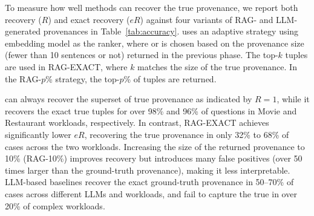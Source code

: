 \vspace{1pt}
To measure how well methods can recover the true provenance, we report both recovery ($R$) and exact recovery ($eR$)  against four variants of RAG- and LLM-generated provenances in Table~\ref{tab:accuracy}.  \sys uses an adaptive strategy using embedding model as the ranker, where  or  is chosen based on the provenance size (fewer than 10 sentences or not) returned in the previous phase. %
  The top-$k$ tuples are used in RAG-EXACT, where $k$ matches the size of the true provenance. In the RAG-$p$\% strategy, the top-$p$\% of tuples are returned.

\sys can always recover the superset of true provenance as indicated by $R=1$, while it recovers the exact true tuples for over 98\% and 96\% of questions in Movie and Restaurant workloads, respectively. %
In contrast, RAG-EXACT achieves significantly lower $eR$, recovering the  true provenance in only 32\% to 68\% of cases across the two workloads.  Increasing the size of the returned provenance to 10\% (RAG-10\%) improves recovery but introduces many false positives (over 50 times larger than the ground-truth provenance), making it less interpretable.  
LLM-based baselines recover the exact ground-truth provenance in 50--70\% of cases across different LLMs and workloads, and fail to capture the true in over 20\% of complex workloads.  


